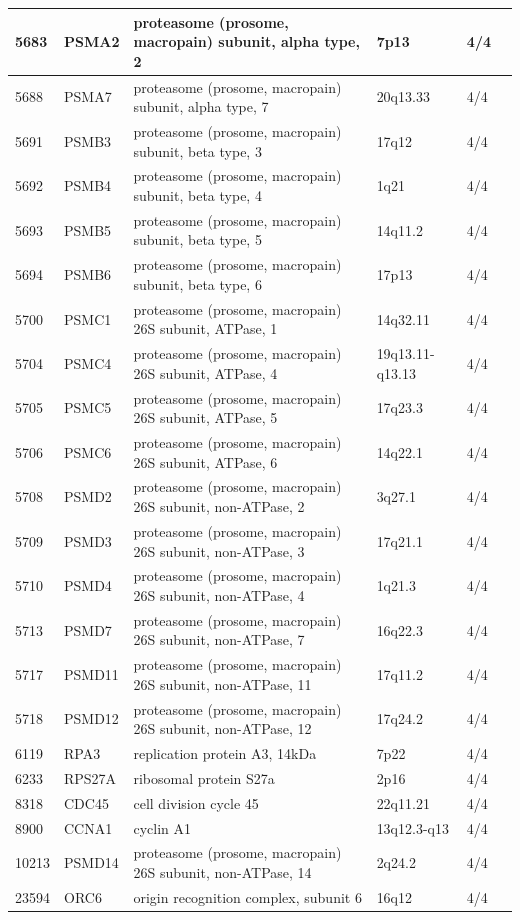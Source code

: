 \documentclass[11pt]{article}
\begin{document}
\begin{table}
\begin{tabular}{|l|l|l|l|l|l|}
\hline
5683 & PSMA2 & proteasome (prosome, macropain) subunit, alpha type, 2 & 7p13 & 4/4 \\
\hline
5688 & PSMA7 & proteasome (prosome, macropain) subunit, alpha type, 7 & 20q13.33 & 4/4 \\
\hline
5691 & PSMB3 & proteasome (prosome, macropain) subunit, beta type, 3 & 17q12 & 4/4 \\
\hline
5692 & PSMB4 & proteasome (prosome, macropain) subunit, beta type, 4 & 1q21 & 4/4 \\
\hline
5693 & PSMB5 & proteasome (prosome, macropain) subunit, beta type, 5 & 14q11.2 & 4/4 \\
\hline
5694 & PSMB6 & proteasome (prosome, macropain) subunit, beta type, 6 & 17p13 & 4/4 \\
\hline
5700 & PSMC1 & proteasome (prosome, macropain) 26S subunit, ATPase, 1 & 14q32.11 & 4/4 \\
\hline
5704 & PSMC4 & proteasome (prosome, macropain) 26S subunit, ATPase, 4 & 19q13.11-q13.13 & 4/4 \\
\hline
5705 & PSMC5 & proteasome (prosome, macropain) 26S subunit, ATPase, 5 & 17q23.3 & 4/4 \\
\hline
5706 & PSMC6 & proteasome (prosome, macropain) 26S subunit, ATPase, 6 & 14q22.1 & 4/4 \\
\hline
5708 & PSMD2 & proteasome (prosome, macropain) 26S subunit, non-ATPase, 2 & 3q27.1 & 4/4 \\
\hline
5709 & PSMD3 & proteasome (prosome, macropain) 26S subunit, non-ATPase, 3 & 17q21.1 & 4/4 \\
\hline
5710 & PSMD4 & proteasome (prosome, macropain) 26S subunit, non-ATPase, 4 & 1q21.3 & 4/4 \\
\hline
5713 & PSMD7 & proteasome (prosome, macropain) 26S subunit, non-ATPase, 7 & 16q22.3 & 4/4 \\
\hline
5717 & PSMD11 & proteasome (prosome, macropain) 26S subunit, non-ATPase, 11 & 17q11.2 & 4/4 \\
\hline
5718 & PSMD12 & proteasome (prosome, macropain) 26S subunit, non-ATPase, 12 & 17q24.2 & 4/4 \\
\hline
6119 & RPA3 & replication protein A3, 14kDa & 7p22 & 4/4 \\
\hline
6233 & RPS27A & ribosomal protein S27a & 2p16 & 4/4 \\
\hline
8318 & CDC45 & cell division cycle 45 & 22q11.21 & 4/4 \\
\hline
8900 & CCNA1 & cyclin A1 & 13q12.3-q13 & 4/4 \\
\hline
10213 & PSMD14 & proteasome (prosome, macropain) 26S subunit, non-ATPase, 14 & 2q24.2 & 4/4 \\
\hline
23594 & ORC6 & origin recognition complex, subunit 6 & 16q12 & 4/4 \\
\hline
\end{tabular}
\end{table}
\end{document}
